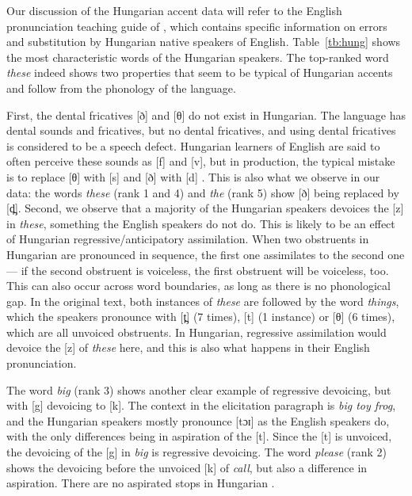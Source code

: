 \documentclass[output=paper]{LSP/langsci}
\begin{document}
Our discussion of the Hungarian accent data will refer to the English pronunciation teaching guide of \citet{nadasdy_background_2006}, which contains specific information on errors and substitution by Hungarian native speakers of English. Table~\ref{tb:hung} shows the most characteristic words of the Hungarian speakers. The top-ranked word \textit{these} indeed shows two properties that seem to be typical of Hungarian accents and follow from the phonology of the language.

First, the dental fricatives [ð] and [θ] do not exist in Hungarian. The language has dental sounds and fricatives, but no dental fricatives, and using dental fricatives is considered to be a speech defect. Hungarian learners of English are said to often perceive these sounds as [f] and [v], but in production, the typical mistake is to replace [θ] with [s] and [ð] with [d] \citep[p. 71]{nadasdy_background_2006}. This is also what we observe in our data: the words \textit{these} (rank 1 and 4) and \textit{the} (rank 5) show [ð] being replaced by [d̪]. Second, we observe that a majority of the Hungarian speakers devoices the [z] in \textit{these}, something the English speakers do not do. This is likely to be an effect of Hungarian regressive/anticipatory assimilation. When two obstruents in Hungarian are pronounced in sequence, the first one assimilates to the second one --- if the second obstruent is voiceless, the first obstruent will be voiceless, too. This can also occur across word boundaries, as long as there is no phonological gap. In the original text, both instances of \textit{these} are followed by the word \textit{things}, which the speakers pronounce with [t̪] (7 times), [t] (1 instance) or [θ] (6 times), which are all unvoiced obstruents. In Hungarian, regressive assimilation would devoice the [z] of \textit{these} here, and this is also what happens in their English pronunciation.

The word \textit{big} (rank 3) shows another clear example of regressive devoicing, but with [g] devoicing to [k]. The context in the elicitation paragraph is \textit{big toy frog}, and the Hungarian speakers mostly pronounce [tɔɪ] as the English speakers do, with the only differences being in aspiration of the [t]. Since the [t] is unvoiced, the devoicing of the [g] in \textit{big} is regressive devoicing. The word \textit{please} (rank 2) shows the devoicing before the unvoiced [k] of \textit{call}, but also a difference in aspiration. There are no aspirated stops in Hungarian \citep{petrova_voice_2006}.
\end{document}
